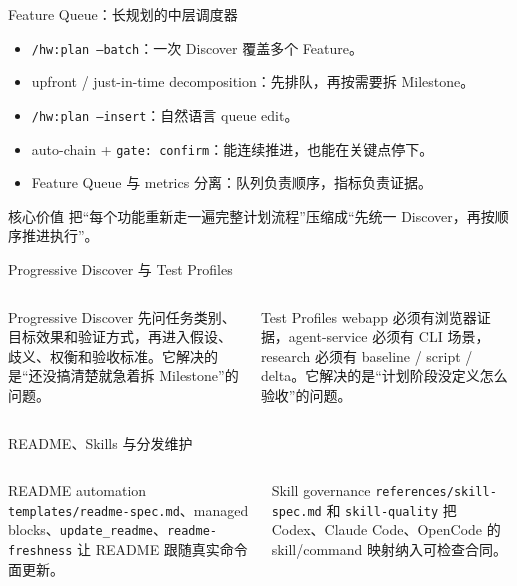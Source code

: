 \documentclass[theme=workflow,aspectratio=169,fontset=tech]{Hypo-Slide}
\begin{document}
\begin{frame}{Feature Queue：长规划的中层调度器}
  \begin{itemize}
    \item \texttt{/hw:plan --batch}：一次 Discover 覆盖多个 Feature。
    \item upfront / just-in-time decomposition：先排队，再按需要拆 Milestone。
    \item \texttt{/hw:plan --insert}：自然语言 queue edit。
    \item auto-chain + \texttt{gate: confirm}：能连续推进，也能在关键点停下。
    \item Feature Queue 与 metrics 分离：队列负责顺序，指标负责证据。
  \end{itemize}
  \vspace{0.25cm}
  \begin{block}{核心价值}
    把“每个功能重新走一遍完整计划流程”压缩成“先统一 Discover，再按顺序推进执行”。
  \end{block}
\end{frame}

\begin{frame}{Progressive Discover 与 Test Profiles}
  \begin{columns}[T,totalwidth=\textwidth]
    \begin{block}{Progressive Discover}
      先问任务类别、目标效果和验证方式，再进入假设、歧义、权衡和验收标准。它解决的是“还没搞清楚就急着拆 Milestone”的问题。
    \end{block}
    \begin{block}{Test Profiles}
      webapp 必须有浏览器证据，agent-service 必须有 CLI 场景，research 必须有 baseline / script / delta。它解决的是“计划阶段没定义怎么验收”的问题。
    \end{block}
  \end{columns}
\end{frame}

\begin{frame}{README、Skills 与分发维护}
  \begin{columns}[T,totalwidth=\textwidth]
    \begin{block}{README automation}
      \texttt{templates/readme-spec.md}、managed blocks、\texttt{update\_readme}、\texttt{readme-freshness} 让 README 跟随真实命令面更新。
    \end{block}
    \begin{block}{Skill governance}
      \texttt{references/skill-spec.md} 和 \texttt{skill-quality} 把 Codex、Claude Code、OpenCode 的 skill/command 映射纳入可检查合同。
    \end{block}
  \end{columns}
\end{frame}
\end{document}
